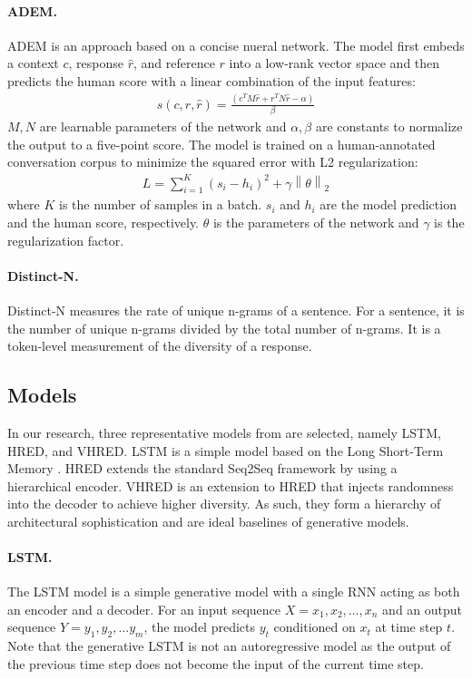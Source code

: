 \documentclass[runningheads]{llncs}
\begin{document}
    \paragraph{ADEM.}
    ADEM \cite{ADEM} is an approach based on a concise nueral network. The model first embeds a context $c$, response $\hat{r}$, and reference $r$ into a low-rank vector space and then predicts the human score with a linear combination of the input features:
    \begin{align}
        s(c, r, \hat{r}) = \frac{(c^T M \hat{r} + r^T N \hat{r} - \alpha)}{\beta}
    \end{align}
    $M, N$ are learnable parameters of the network and $\alpha, \beta$ are constants to normalize the output to a five-point score. The model is trained on a human-annotated conversation corpus to minimize the squared error with L2 regularization:
    \begin{align}
        L = \sum_{i=1}^{K} (s_i - h_i)^2 + \gamma \left\| \theta \right\| _2
    \end{align}
    where $K$ is the number of samples in a batch. $s_i$ and $h_i$ are the model prediction and the human score, respectively. $\theta$ is the parameters of the network and $\gamma$ is the regularization factor.

    \paragraph{Distinct-N.}
    Distinct-N \cite{MMI} measures the rate of unique n-grams of a sentence. For a sentence, it is the number of unique n-grams divided by the total number of n-grams. It is a token-level measurement of the diversity of a response.

    \subsection{Models}
    In our research, three representative models from \cite{VHRED} are selected, namely LSTM, HRED, and VHRED. LSTM is a simple model based on the Long Short-Term Memory \cite{LSTM}. HRED extends the standard Seq2Seq framework by using a hierarchical encoder. VHRED is an extension to HRED that injects randomness into the decoder to achieve higher diversity. As such, they form a hierarchy of architectural sophistication and are ideal baselines of generative models.

    \paragraph{LSTM.}
    The LSTM model is a simple generative model with a single RNN acting as both an encoder and a decoder. For an input sequence $X = x_1, x_2, \dots, x_n$ and an output sequence $Y = y_1, y_2, \dots y_m$, the model predicts $y_t$ conditioned on $x_t$ at time step $t$. Note that the generative LSTM is not an autoregressive model as the output of the previous time step does not become the input of the current time step.
\end{document}
